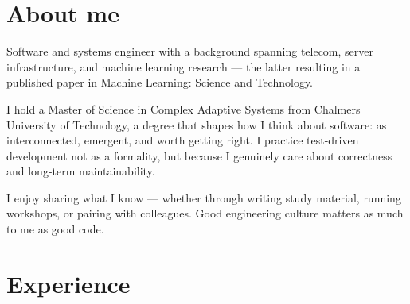 \documentclass[letterpaper]{twentysecondcv} %
\begin{document}
\makeprofile %
\small

\section{About me}
Software and systems engineer with a background spanning telecom, server infrastructure,
and machine learning research — the latter resulting in a published paper in Machine Learning: Science and Technology.

I hold a Master of Science in Complex Adaptive Systems from Chalmers University of Technology,
a degree that shapes how I think about software: as interconnected, emergent, and worth getting right.
I practice test-driven development not as a formality, but because I genuinely care about correctness and long-term maintainability.

I enjoy sharing what I know — whether through writing study material, running workshops, or pairing with colleagues.
Good engineering culture matters as much to me as good code.



\section{Experience}
\end{document}

